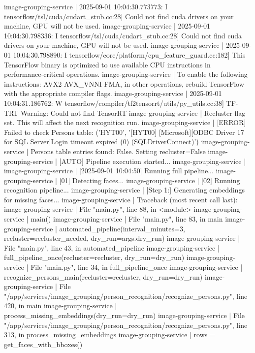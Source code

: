 image-grouping-service  | 2025-09-01 10:04:30.773773: I tensorflow/tsl/cuda/cudart_stub.cc:28] Could not find cuda drivers on your machine, GPU will not be used.
image-grouping-service  | 2025-09-01 10:04:30.798336: I tensorflow/tsl/cuda/cudart_stub.cc:28] Could not find cuda drivers on your machine, GPU will not be used.
image-grouping-service  | 2025-09-01 10:04:30.798890: I tensorflow/core/platform/cpu_feature_guard.cc:182] This TensorFlow binary is optimized to use available CPU instructions in performance-critical operations.
image-grouping-service  | To enable the following instructions: AVX2 AVX_VNNI FMA, in other operations, rebuild TensorFlow with the appropriate compiler flags.
image-grouping-service  | 2025-09-01 10:04:31.186762: W tensorflow/compiler/tf2tensorrt/utils/py_utils.cc:38] TF-TRT Warning: Could not find TensorRT
image-grouping-service  | Recluster flag set. This will affect the next recognition run.
image-grouping-service  | [ERROR] Failed to check Persons table: ('HYT00', '[HYT00] [Microsoft][ODBC Driver 17 for SQL Server]Login timeout expired (0) (SQLDriverConnect)')
image-grouping-service  | Persons table entries found: False. Setting recluster=False
image-grouping-service  | [AUTO] Pipeline execution started...
image-grouping-service  |
image-grouping-service  | [2025-09-01 10:04:50] Running full pipeline...
image-grouping-service  | [01] Detecting faces...
image-grouping-service  | [02] Running recognition pipeline...
image-grouping-service  | [Step 1:] Generating embeddings for missing faces...
image-grouping-service  | Traceback (most recent call last):
image-grouping-service  |   File "main.py", line 88, in <module>
image-grouping-service  |     main()
image-grouping-service  |   File "main.py", line 83, in main
image-grouping-service  |     automated_pipeline(interval_minutes=3, recluster=recluster_needed, dry_run=args.dry_run)
image-grouping-service  |   File "main.py", line 43, in automated_pipeline
image-grouping-service  |     full_pipeline_once(recluster=recluster, dry_run=dry_run)
image-grouping-service  |   File "main.py", line 34, in full_pipeline_once
image-grouping-service  |     recognize_persons_main(recluster=recluster, dry_run=dry_run)
image-grouping-service  |   File "/app/services/image_grouping/person_recognition/recognize_persons.py", line 420, in main
image-grouping-service  |     process_missing_embeddings(dry_run=dry_run)
image-grouping-service  |   File "/app/services/image_grouping/person_recognition/recognize_persons.py", line 313, in process_missing_embeddings
image-grouping-service  |     rows = get_faces_with_bboxes()
